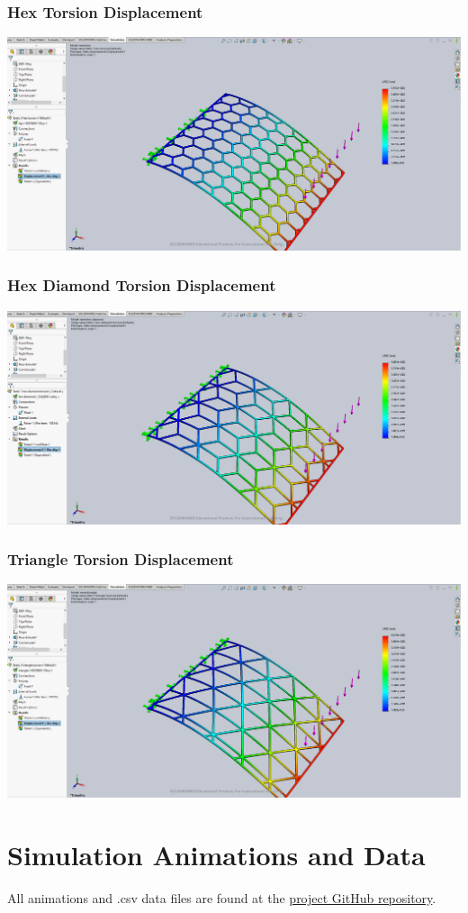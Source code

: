 \documentclass[12pt, letterpaper]{article}
\begin{document}
\begin{singlespace}
\subsubsection{Hex Torsion Displacement}
\label{ap:h-to-d}
\includegraphics[width=0.8\linewidth]{./graphs/torsion/hex-torsion-displacement}

\subsubsection{Hex Diamond Torsion Displacement}
\label{ap:hd-to-d}
\includegraphics[width=0.8\linewidth]{./graphs/torsion/hex-diamond-torsion-displacement}

\subsubsection{Triangle Torsion Displacement}
\label{ap:t-to-d}
\includegraphics[width=0.8\linewidth]{./graphs/torsion/triangle-torsion-displacement}



\section{Simulation Animations and Data}
\label{ap:data}

All animations and .csv data files are found at the \href{https://github.com/tynanpurdy/physics-ia/tree/master/data}{project GitHub repository}.

\end{singlespace}
\end{document}
